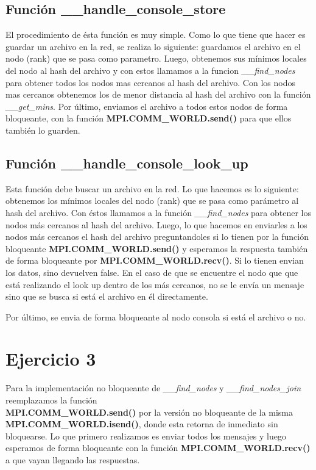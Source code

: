 \subsection{Función \_\_handle\_console\_store}
El procedimiento de ésta función es muy simple. Como lo que tiene que hacer es guardar un archivo en la red, se realiza lo siguiente: guardamos el archivo en el nodo (rank) que se pasa como parametro. Luego, obtenemos sus mínimos locales del nodo al hash del archivo y con estos llamamos a la funcion \emph{\_\_find\_nodes} para obtener todos los nodos mas cercanos al hash del archivo. Con los nodos mas cercanos obtenemos los de menor distancia al hash del archivo con la función \emph{\_\_get\_mins}. Por último, enviamos el archivo a todos estos nodos de forma bloqueante, con la función \textbf{MPI.COMM\_WORLD.send()} para que ellos también lo guarden.


\subsection{Función \_\_handle\_console\_look\_up}
Esta función debe buscar un archivo en la red. Lo que hacemos es lo siguiente: obtenemos los mínimos locales del nodo (rank) que se pasa como parámetro al hash del archivo. Con éstos llamamos a la función \emph{\_\_find\_nodes} para obtener los nodos más cercanos al hash del archivo. Luego, lo que hacemos en enviarles a los nodos más cercanos el hash del archivo preguntandoles si lo tienen por la función bloqueante \textbf{MPI.COMM\_WORLD.send()} y esperamos la respuesta también de forma bloqueante por \textbf{MPI.COMM\_WORLD.recv()}. Si lo tienen envian los datos, sino devuelven false. En el caso de que se encuentre el nodo que que está realizando el look up dentro de los más cercanos, no se le envía un mensaje sino que se busca si está el archivo en él directamente.

Por último, se envia de forma bloqueante al nodo consola si está el archivo o no.

\section{Ejercicio 3}
Para la implementación no bloqueante de \emph{\_\_find\_nodes} y  \emph{\_\_find\_nodes\_join} reemplazamos la función \\ \textbf{MPI.COMM\_WORLD.send()} por la versión no bloqueante de la misma \textbf{MPI.COMM\_WORLD.isend()}, donde esta retorna de inmediato sin bloquearse. Lo que primero realizamos es enviar todos los mensajes y luego esperamos de forma bloqueante con la función \textbf{MPI.COMM\_WORLD.recv()} a que vayan llegando las respuestas.

